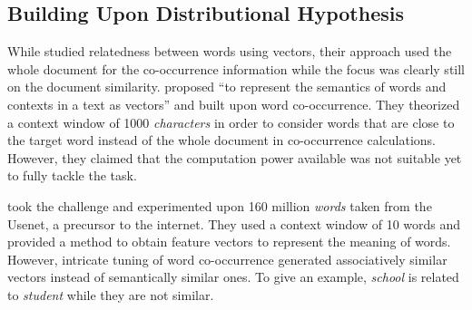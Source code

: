 \subsection{Building Upon Distributional Hypothesis}%
\label{sub:building_upon_distributional_hypothesis}

While \citeauthor{deerwester_indexing_1990} studied relatedness between words using vectors, their approach used the whole document for the co-occurrence information while the focus was clearly still on the document similarity.
\textcite{schutze_dimensions_1992} proposed \enquote{to represent the semantics of words and contexts in a text as vectors} and built upon word co-occurrence.
They theorized a context window of 1000 \emph{characters} in order to consider words that are close to the target word instead of the whole document in co-occurrence calculations.
However, they claimed that the computation power available was not suitable yet to fully tackle the task.

\textcite{lund_producing_1996} took the challenge and experimented upon 160 million \emph{words} taken from the Usenet, a precursor to the internet.
They used a context window of 10 words and provided a method to obtain feature vectors to represent the meaning of words.
However, intricate tuning of word co-occurrence generated associatively similar vectors instead of semantically similar ones.
To give an example, \emph{school} is related to \emph{student} while they are not similar.

